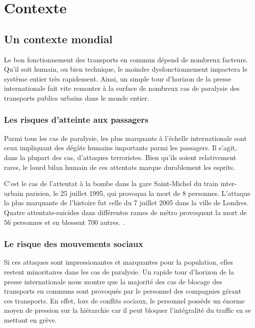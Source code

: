 \chapter{Contexte}

	\section{Un contexte mondial}

	Le bon fonctionnement des transports en commun dépend de nombreux facteurs. Qu'il soit humain, ou bien technique, le moindre dysfonctionnement impactera le système entier très rapidement. Ainsi, un simple tour d'horizon de la presse internationale fait vite remonter à la surface de nombreux cas de paralysie des transports publics urbains dans le monde entier.

		\subsection{ Les risques d'atteinte aux passagers }

	Parmi tous les cas de paralysie, les plus marquants à l'échelle internationale sont ceux impliquant des dégâts humains importants parmi les passagers. Il s'agit, dans la plupart des cas, d'attaques terroristes. Bien qu'ils soient relativement rares, le lourd bilan humain de ces attentats marque durablement les esprits.

	C'est le cas de l'attentat à la bombe dans la gare Saint-Michel du train inter-urbain parisien, le 25 juillet 1995, qui provoqua la mort de 8 personnes\cite{stmichel}. L'attaque la plus marquante de l'histoire fut celle du 7 juillet 2005 dans la ville de Londres. Quatre attentats-suicides dans différentes rames de métro provoquent la mort de 56 personnes et en blessent 700 autres. \cite{london_attacks}.

    	\subsection{ Le risque des mouvements sociaux }
    	
	Si ces attaques sont impressionantes et marquantes pour la population, elles restent minoritaires dans les cas de paralysie. Un rapide tour d'horizon de la presse internationale nous montre que la majorité des cas de blocage des transports en communs sont provoqués par le personnel des compagnies gérant ces transports. En effet, lors de conflits sociaux, le personnel possède un énorme moyen de pression sur la hiérarchie car il peut bloquer l'intégralité du traffic en se mettant en grève. 

